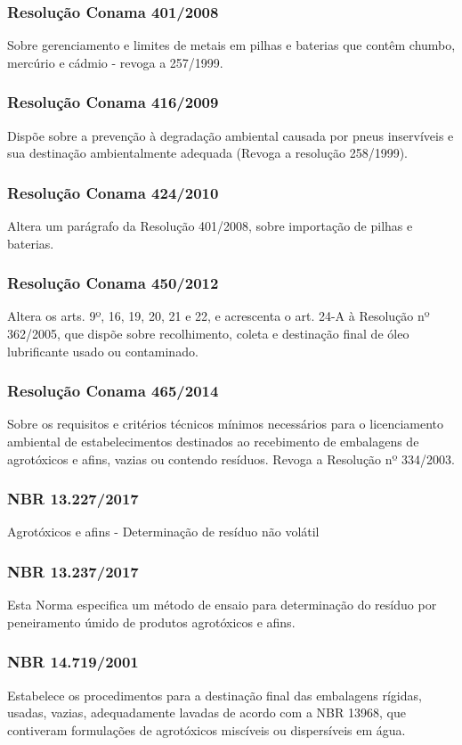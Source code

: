 \begin{subapend}
\begin{subsubapend}
		\subsubsection{Resolução Conama 401/2008}
		Sobre gerenciamento e limites de metais em pilhas e baterias que contêm chumbo, mercúrio e cádmio - revoga a 257/1999.
		\subsubsection{Resolução Conama 416/2009}
		Dispõe sobre a prevenção à degradação ambiental causada por pneus inservíveis e sua destinação ambientalmente adequada (Revoga a resolução 258/1999).
		\subsubsection{Resolução Conama 424/2010}
		Altera um parágrafo da Resolução 401/2008, sobre importação de pilhas e baterias.
		\subsubsection{Resolução Conama 450/2012}
		Altera os arts. 9º, 16, 19, 20, 21 e 22, e acrescenta o art. 24-A à Resolução nº 362/2005, que dispõe sobre recolhimento, coleta e destinação final de óleo lubrificante usado ou contaminado.
		\subsubsection{Resolução Conama 465/2014}
		Sobre os requisitos e critérios técnicos mínimos necessários para o licenciamento ambiental de estabelecimentos destinados ao recebimento de embalagens de agrotóxicos e afins, vazias ou contendo resíduos. Revoga a Resolução nº 334/2003.
		\subsubsection{NBR 13.227/2017}
		Agrotóxicos e afins - Determinação de resíduo não volátil
		\subsubsection{NBR 13.237/2017}
		Esta Norma especifica um método de ensaio para determinação do resíduo por peneiramento úmido de produtos agrotóxicos e afins. 
		\subsubsection{NBR 14.719/2001}
		Estabelece os procedimentos para a destinação final das embalagens rígidas, usadas, vazias, adequadamente lavadas de acordo com a NBR 13968, que contiveram formulações de agrotóxicos miscíveis ou dispersíveis em água.

\end{subsubapend}
\end{subapend}
